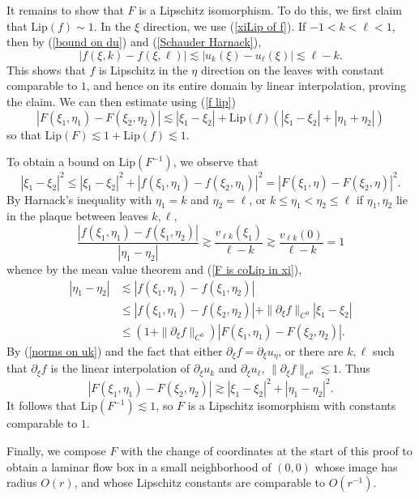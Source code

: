 \documentclass[reqno,11pt]{amsart}
\newcommand{\Lip}{\mathrm{Lip}}
\theoremstyle{definition}
\numberwithin{equation}{section}
\begin{document}
It remains to show that $F$ is a Lipschitz isomorphism.
To do this, we first claim that $\Lip(f) \sim 1$.
In the $\xi$ direction, we use (\ref{xiLip of f}).
If $-1 < k < \ell < 1$, then by (\ref{bound on du}) and (\ref{Schauder Harnack}),
\begin{equation}\label{f lip}
	|f(\xi, k) - f(\xi, \ell)| \lesssim |u_k(\xi) - u_\ell(\xi)| \lesssim \ell - k.
\end{equation}
This shows that $f$ is Lipschitz in the $\eta$ direction on the leaves with constant comparable to $1$, and hence on its entire domain by linear interpolation, proving the claim.
We can then estimate using (\ref{f lip})
$$|F(\xi_1, \eta_1) - F(\xi_2, \eta_2)| \lesssim |\xi_1 - \xi_2| + \Lip(f)(|\xi_1 - \xi_2| + |\eta_1 + \eta_2|)$$
so that $\Lip(F) \lesssim 1 + \Lip(f) \lesssim 1$.

To obtain a bound on $\Lip(F^{-1})$, we observe that
\begin{equation}\label{F is coLip in xi}
|\xi_1 - \xi_2|^2
\leq |\xi_1 - \xi_2|^2 + |f(\xi_1, \eta_1) - f(\xi_2, \eta_1)|^2 
= |F(\xi_1, \eta) - F(\xi_2, \eta)|^2.
\end{equation}
By Harnack's inequality with $\eta_1 = k$ and $\eta_2 = \ell$, or $k \leq \eta_1 < \eta_2 \leq \ell$ if $\eta_1, \eta_2$ lie in the plaque between leaves $k, \ell$,
$$\frac{|f(\xi_1, \eta_1) - f(\xi_1, \eta_2)|}{|\eta_1 - \eta_2|} \gtrsim \frac{v_{\ell k}(\xi_1)}{\ell - k} \gtrsim \frac{v_{\ell k}(0)}{\ell - k} = 1$$
whence by the mean value theorem and (\ref{F is coLip in xi}),
\begin{align*}
	|\eta_1 - \eta_2| 
	&\lesssim |f(\xi_1, \eta_1) - f(\xi_1, \eta_2)| \\
	&\leq |f(\xi_1, \eta_1) - f(\xi_2, \eta_2)| + \|\partial_\xi f\|_{C^0} |\xi_1 - \xi_2| \\
	&\leq (1 + \|\partial_\xi f\|_{C^0}) |F(\xi_1, \eta_1) - F(\xi_2, \eta_2)|.
\end{align*}
By (\ref{norms on uk}) and the fact that either $\partial_\xi f = \partial_\xi u_\eta$, or there are $k,\ell$ such that $\partial_\xi f$ is the linear interpolation of $\partial_\xi u_k$ and $\partial_\xi u_\ell$, $\|\partial_\xi f\|_{C^0} \lesssim 1$.
Thus
$$|F(\xi_1, \eta_1) - F(\xi_2, \eta_2)| \gtrsim |\xi_1 - \xi_2|^2 + |\eta_1 - \eta_2|^2.$$
It follows that $\Lip(F^{-1}) \lesssim 1$, so $F$ is a Lipschitz isomorphism with constants comparable to $1$.

Finally, we compose $F$ with the change of coordinates at the start of this proof to obtain a laminar flow box in a small neighborhood of $(0, 0)$ whose image has radius $O(r)$, and whose Lipschitz constants are comparable to $O(r^{-1})$.
\end{document}
